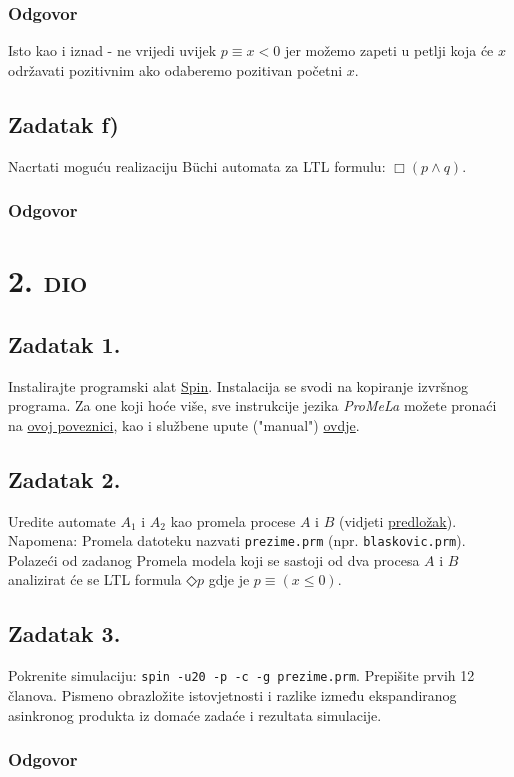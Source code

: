 \documentclass{article}
\newcommand{\sekcija}[1]{\section{\textsc{#1}}}
\newcommand{\dio}[1]{\sekcija{#1. dio}}
\newcommand{\zadatak}[1]{\subsection{Zadatak #1}}
\newcommand{\odgovor}{\subsubsection*{Odgovor}}
\begin{document}
\odgovor

Isto kao i iznad - ne vrijedi uvijek $p \equiv x < 0$ jer možemo zapeti u petlji koja će $x$ održavati pozitivnim ako odaberemo pozitivan početni $x$.

\zadatak{f)}

Nacrtati moguću realizaciju Büchi automata za LTL formulu: $\Box(p \wedge q)$.

\odgovor

\begin{center}
\end{center}


\pagebreak





\dio{2}

\zadatak{1.}

Instalirajte programski alat \href{http://spinroot.com/spin/Bin/index.html}{Spin}. Instalacija se svodi na kopiranje izvršnog programa. Za one koji hoće više, sve instrukcije jezika \textit{ProMeLa} možete pronaći na \href{http://spinroot.com/spin/Man/promela.html}{ovoj poveznici}, kao i službene upute ("manual") \href{http://spinroot.com/spin/Man/Manual.html}{ovdje}.


\zadatak{2.}

Uredite automate $A_1$ i $A_2$ kao promela procese $A$ i $B$ (vidjeti \hyperref[sec:promela-template]{predložak}). Napomena: Promela datoteku nazvati \texttt{prezime.prm} (npr. \texttt{blaskovic.prm}). Polazeći od zadanog Promela modela koji se sastoji od dva procesa $A$ i $B$ analizirat će se LTL formula $\mathbin{\Diamond}p$ gdje je $p \equiv (x \leq 0)$.


\zadatak{3.}

Pokrenite simulaciju: \texttt{spin -u20 -p -c -g prezime.prm}. Prepišite prvih 12 članova. Pismeno obrazložite istovjetnosti i razlike između ekspandiranog asinkronog produkta iz domaće zadaće i rezultata simulacije.

\odgovor
\end{document}
